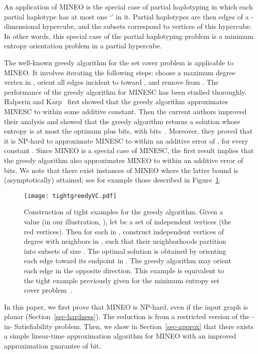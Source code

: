 \documentclass[11pt]{article}
\begin{document}
An application of MINEO is the special case of partial haplotyping
in which each partial haplotype has at most one `' in it. Partial haplotypes are then edges of a -dimensional hypercube, and the subsets  correspond to vertices of this hypercube. In other words, this special case of the partial haplotyping problem is a minimum entropy orientation problem in a partial hypercube.

The well-known greedy algorithm for the set cover problem is applicable to MINEO. It involves iterating the following steps: choose a maximum degree vertex  in , orient all edges incident to  toward , and remove  from . The performance of the greedy algorithm for MINESC has been studied thoroughly. Halperin and Karp~\cite{HK05} first showed that the greedy algorithm approximates MINESC to within some additive constant.  Then the current authors improved their analysis and showed that the greedy algorithm returns a solution whose entropy is at most the optimum plus  bits, with  bits~\cite{CFJ08}. Moreover, they proved that it is NP-hard to approximate MINESC to within an additive error of , for every constant . Since MINEO is a special case of MINESC, the first result implies that the greedy algorithm also approximates MINEO to within an additive error of  bits. We note that there exist instances of MINEO where the latter bound is (asymptotically) attained; see for example those described in Figure~\ref{fig:tight}.

\begin{figure}
\begin{center}
\texttt{[image: tightgreedyVC.pdf]}
\end{center}
\caption{\label{fig:tight}Construction of tight examples for the greedy  algorithm. Given a value  (in our illustration, ), let  be a set of  independent vertices (the red vertices). Then for each  in , construct  independent vertices of degree  with neighbors in , such that their neighborhoods partition  into subsets of size . The optimal solution is obtained by orienting each edge toward its endpoint in . The greedy algorithm may orient each edge in the opposite direction. This example is equivalent to the tight example previously given for the minimum entropy set cover problem~\cite{CFJ08}.}
\end{figure}

In this paper, we first prove that MINEO is NP-hard, even if the input
graph is planar (Section~\ref{sec-hardness}). The reduction is from a restricted version of the -in- Satisfiability problem. Then, we show in Section~\ref{sec-approx} that there exists a simple linear-time approximation algorithm for MINEO with an improved approximation guarantee of  bit. 
\end{document}
